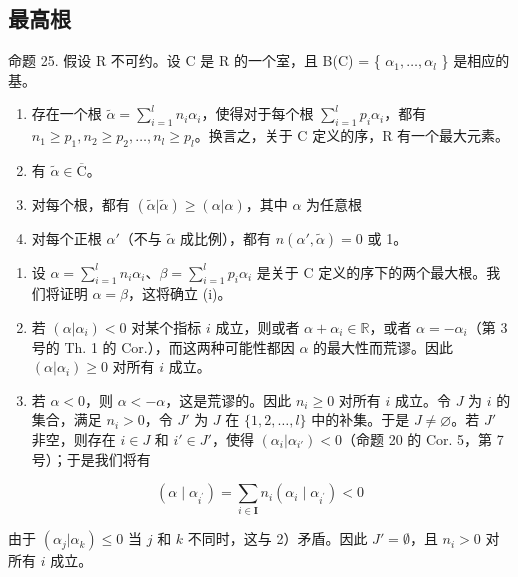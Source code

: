 \subsection{最高根}

命题 25. 假设 R 不可约。设 C 是 R 的一个室，且 B(C) = \{ \(\alpha_{1}, \ldots, \alpha_{l}\) \} 是相应的基。

\begin{enumerate}
\def\labelenumi{(\roman{enumi})}
\item
  存在一个根 \(\tilde{\alpha} = \sum_{i=1}^{l} n_i \alpha_i\)，使得对于每个根 \(\sum_{i=1}^{l} p_i \alpha_i\)，都有 \(n_1 \geqslant p_1, n_2 \geqslant p_2, \ldots, n_l \geqslant p_l\)。换言之，关于 C 定义的序，R 有一个最大元素。
\item
  有 \(\tilde{\alpha} \in \overline{\mathrm{C}}\)。
\item
   对每个根，都有 \((\tilde{\alpha}|\tilde{\alpha})\geqslant (\alpha |\alpha)\)，其中 \(\alpha\) 为任意根
\item
  对每个正根 \(\alpha'\)（不与 \(\tilde{\alpha}\) 成比例），都有 \(n(\alpha', \tilde{\alpha}) = 0\) 或 1。
\end{enumerate}

\begin{enumerate}
\def\labelenumi{\arabic{enumi})}
\item
  设 \(\alpha = \sum_{i=1}^{l} n_i \alpha_i\)、\(\beta = \sum_{i=1}^{l} p_i \alpha_i\) 是关于 C 定义的序下的两个最大根。我们将证明 \(\alpha = \beta\)，这将确立 (i)。
\item
  若 \((\alpha | \alpha_i) < 0\) 对某个指标 \(i\) 成立，则或者 \(\alpha + \alpha_i \in \mathbb{R}\)，或者 \(\alpha = -\alpha_i\)（第 3 号的 Th. 1 的 Cor.），而这两种可能性都因 \(\alpha\) 的最大性而荒谬。因此 \((\alpha | \alpha_i) \geqslant 0\) 对所有 \(i\) 成立。
\item
  若 \(\alpha < 0\)，则 \(\alpha < -\alpha\)，这是荒谬的。因此 \(n_i \geqslant 0\) 对所有 \(i\) 成立。令 \(J\) 为 \(i\) 的集合，满足 \(n_i > 0\)，令 \(J'\) 为 \(J\) 在 \(\{1, 2, \ldots, l\}\) 中的补集。于是 \(J \neq \varnothing\)。若 \(J'\) 非空，则存在 \(i \in J\) 和 \(i' \in J'\)，使得 \((\alpha_i | \alpha_{i'}) < 0\)（命题 20 的 Cor. 5，第 7 号）；于是我们将有
\end{enumerate}

\[
\left(\alpha \mid \alpha_ {i ^ {\prime}}\right) = \sum_ {i \in \mathbf {I}} n _ {i} \left(\alpha_ {i} \mid \alpha_ {i ^ {\prime}}\right) <   0
\]

  由于 \((\alpha_{j}|\alpha_{k})\leqslant 0\) 当 \(j\) 和 \(k\) 不同时，这与 2）矛盾。因此 \(J' = \emptyset\)，且 \(n_i > 0\) 对所有 \(i\) 成立。

